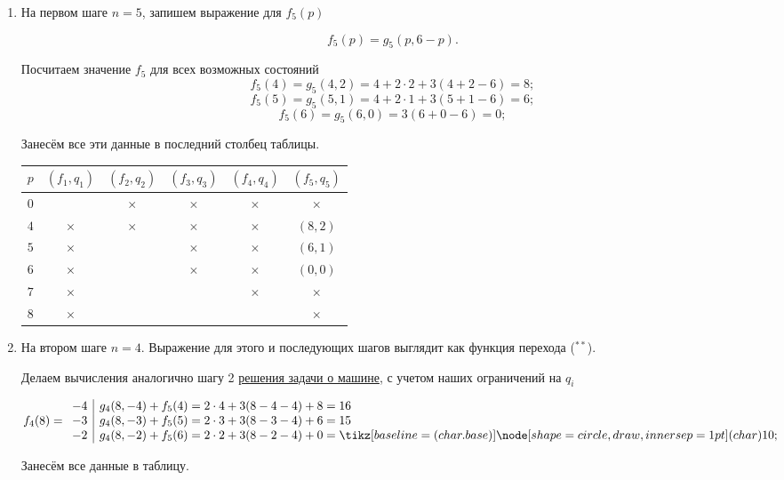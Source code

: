 \begin{enumerate}
	\item[\fbox{\textbf{Шаг 1}}] На первом шаге $n = 5$, запишем выражение для $f_5(p)$
	
	\[
	f_5(p) = g_5(p, 6 - p).
	\]
	
	Посчитаем значение $f_5$ для всех возможных состояний
	\[
	f_5(4) = g_5(4, 2) = 4 + 2\cdot2 + 3(4 + 2 - 6) = 8;
	\]
	\[
	f_5(5) = g_5(5, 1) = 4 + 2\cdot1 + 3(5 + 1 - 6) = 6;
	\]
	\[
	f_5(6) = g_5(6, 0) = 3(6 + 0 - 6) = 0;
	\]
	
	Занесём все эти данные в последний столбец таблицы.
	
	\begin{table}[H]
		\centering
		\begin{tabular}{ | c | c | c | c | c | c | } 
			\hline
			$p$ & $(f_1, q_1)$ & $(f_2, q_2)$ & $(f_3, q_3)$ & $(f_4, q_4)$ & $(f_5, q_5)$ \\ 
			\hline
			$0$ & & $\times$ & $\times$ & $\times$ & $\times$ \\\hline
			$4$ & $\times$ & $\times$ & $\times$ & $\times$ & $(8, 2)$ \\\hline
			$5$ & $\times$ & & $\times$ & $\times$ & $(6, 1)$ \\\hline
			$6$ & $\times$ & & $\times$ & $\times$ & $(0, 0)$ \\\hline
			$7$ & $\times$ & & & $\times$ & $\times$ \\\hline
			$8$ & $\times$ & & & & $\times$ \\\hline
		\end{tabular}
	\end{table}
	
	\item[\fbox{\textbf{Шаг 2}}] На втором шаге $n = 4$. Выражение для этого и последующих шагов выглядит как функция перехода ($^{**}$).
	
	Делаем вычисления аналогично шагу 2 \hyperref[pr:car_on_island]{решения задачи о машине}, с учетом наших ограничений на $q_i$
	
	\[
	f_4(8) = \begin{array}{c|l}
		-4 & g_4(8, -4) + f_5(4) = 2\cdot4 + 3(8 - 4 - 4) + 8 = 16 \\
		-3 & g_4(8, -3) + f_5(5) = 2\cdot3 + 3(8 - 3 - 4) + 6 = 15 \\
		-2 & g_4(8, -2) + f_5(6) = 2\cdot2 + 3(8 - 2 - 4) + 0 = \circled{10} \\
	\end{array}
	\]
	
	Занесём все данные в таблицу.
	

\end{enumerate}
